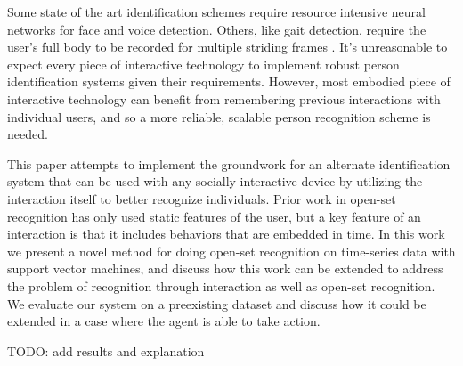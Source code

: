 \documentclass[conference]{IEEEtran}
\newcommand{\elaine}[1]{{\textcolor[rgb]{0.1,0.4,0.6}{[ESS: {\it #1}]}}}
\begin{document}
Some state of the art identification schemes require resource intensive neural networks for face and voice detection. Others, like gait detection, require the user's full body to be recorded for multiple striding frames \cite{liang_wang_silhouette_2003}\cite{han_individual_2006}. It's unreasonable to expect every piece of interactive technology to implement robust person identification systems given their requirements. However, most embodied piece of interactive technology can benefit from remembering previous interactions with individual users, and so a more reliable, scalable person recognition scheme is needed. 

This paper attempts to implement the groundwork for an alternate identification system that can be used with any socially interactive device by utilizing the interaction itself to better recognize individuals. Prior work in open-set recognition has only used static features of the user, but a key feature of an interaction is that it includes behaviors that are embedded in time. In this work we present a novel method for doing open-set recognition on time-series data with support vector machines, and discuss how this work can be extended to address the problem of recognition through interaction as well as open-set recognition. We evaluate our system on a preexisting dataset and discuss how it could be extended in a case where the agent is able to take action. 

TODO: add results and explanation




\end{document}
